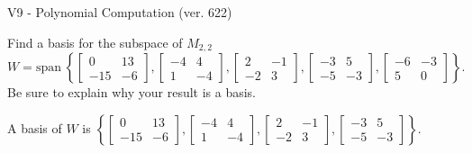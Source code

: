 \begin{exercise}
  \begin{exerciseTitle}V9 - Polynomial Computation (ver. 622)\end{exerciseTitle}
  \begin{exerciseStatement}
    Find a basis for the subspace of \(M_{2,2}\) 
\[W=\mathrm{span}\ \left\{\left[\begin{array}{cc}
0 & 13 \\
-15 & -6
\end{array}\right] , \left[\begin{array}{cc}
-4 & 4 \\
1 & -4
\end{array}\right] , \left[\begin{array}{cc}
2 & -1 \\
-2 & 3
\end{array}\right] , \left[\begin{array}{cc}
-3 & 5 \\
-5 & -3
\end{array}\right] , \left[\begin{array}{cc}
-6 & -3 \\
5 & 0
\end{array}\right]\right\}.\]
 Be sure to explain why your result is a basis.


  \end{exerciseStatement}
  \begin{exerciseAnswer}
   A basis of \(W\) is  \(\left\{\left[\begin{array}{cc}
0 & 13 \\
-15 & -6
\end{array}\right] , \left[\begin{array}{cc}
-4 & 4 \\
1 & -4
\end{array}\right] , \left[\begin{array}{cc}
2 & -1 \\
-2 & 3
\end{array}\right] , \left[\begin{array}{cc}
-3 & 5 \\
-5 & -3
\end{array}\right]\right\}\).
  


  \end{exerciseAnswer}
\end{exercise}
